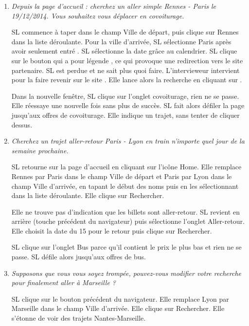 \begin{enumerate}
\item \textit{Depuis la page d'accueil : cherchez un aller simple Rennes - Paris le 19/12/2014. Vous souhaitez vous d\'{e}placer en covoiturage.}

SL commence \`{a} taper  dans le champ \og{}Ville de d\'{e}part\fg{}, puis clique sur Rennes dans la liste d\'{e}roulante. Pour la ville d'arriv\'{e}e, SL s\'{e}lectionne Paris apr\`{e}s avoir seulement entr\'{e} .
SL s\'{e}lectionne la date gr\^{a}ce au calendrier.
SL clique sur le bouton qui a pour l\'{e}gende , ce qui provoque une redirection vers le site partenaire. SL est perdue et ne sait plus quoi faire. L'intervieweur intervient pour la faire revenir sur le site \kel.
Elle lance alors la recherche en cliquant sur .

Dans la nouvelle fen\^{e}tre, SL clique sur l'onglet covoiturage, rien ne se passe. Elle r\'{e}essaye une nouvelle fois sans plus de succ\`{e}s. SL fait alors d\'{e}filer la page jusqu'aux offres de covoiturage. Elle indique un trajet, sans tenter de cliquer dessus.



\item \textit{Cherchez un trajet aller-retour Paris - Lyon en train n'importe quel jour de la semaine prochaine.}

SL retourne sur la page d'accueil en cliquant sur l'ic\^{o}ne \og{}Home\fg{}. 
Elle remplace Rennes par Paris dans le champ \og{}Ville de d\'{e}part\fg{} et Paris par Lyon dans le champ \og{}Ville d'arriv\'{e}e\fg{}, en tapant le d\'{e}but des noms puis en les s\'{e}lectionnant dans la liste d\'{e}roulante. 
Elle clique sur \og{}Rechercher\fg{}.

Elle ne trouve pas d'indication que les billets sont aller-retour. SL revient en arri\`{e}re (touche pr\'{e}c\'{e}dent du navigateur) puis s\'{e}lectionne l'onglet \og{}Aller-retour\fg{}. Elle choisit la date du 15 pour le retour puis clique sur \og{}Rechercher\fg{}.

SL clique sur l'onglet \og{}Bus\fg{} parce qu'il contient le prix le plus bas et rien ne se passe. SL d\'{e}file alors jusqu'aux offres de bus.


\item \textit{Supposons que vous vous soyez tromp\'{e}e, pouvez-vous modifier votre recherche pour finalement aller \`{a} Marseille ?}

SL clique sur le bouton pr\'{e}c\'{e}dent du navigateur. 
Elle remplace Lyon par Marseille dans le champ \og{}Ville d'arriv\'{e}e\fg{}. 
Elle clique sur \og{}Rechercher\fg{}.
Elle s'\'{e}tonne de voir des trajets Nantes-Marseille.



\end{enumerate}

